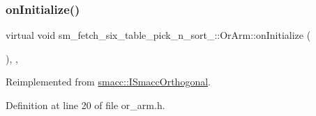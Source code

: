 \subsubsection{\texorpdfstring{on\+Initialize()}{onInitialize()}}
{\footnotesize\ttfamily virtual void sm\+\_\+fetch\+\_\+six\+\_\+table\+\_\+pick\+\_\+n\+\_\+sort\+\_\+::\+Or\+Arm\+::on\+Initialize (\begin{DoxyParamCaption}{ }\end{DoxyParamCaption})\hspace{0.3cm}{\ttfamily [inline]}, {\ttfamily [override]}, {\ttfamily [virtual]}}



Reimplemented from \hyperlink{classsmacc_1_1ISmaccOrthogonal_a6bb31c620cb64dd7b8417f8705c79c7a}{smacc\+::\+I\+Smacc\+Orthogonal}.



Definition at line 20 of file or\+\_\+arm.\+h.


